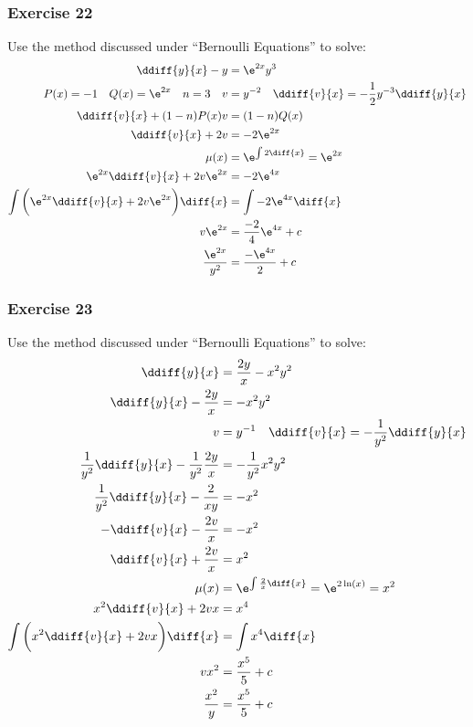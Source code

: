 \documentclass{math}
\begin{document}
\subsubsection*{Exercise 22}
Use the method discussed under ``Bernoulli Equations'' to solve:
\begin{align*}
  \ddiff{y}{x}-y &= \e^{2x}y^3 \\
  P(x) = -1 \quad Q(x) = \e^{2x} \quad n = 3 \quad
    v &= y^{-2} \quad \ddiff{v}{x} = -\frac{1}{2}y^{-3}\ddiff{y}{x} \\
  \ddiff{v}{x}+(1-n)P(x)v &= (1-n)Q(x) \\
  \ddiff{v}{x}+2v &= -2\e^{2x} \\
  \mu(x) &= \e^{\int2\diff{x}} = \e^{2x} \\
  \e^{2x}\ddiff{v}{x}+2v\e^{2x} &= -2\e^{4x} \\
  \int\bigg(\e^{2x}\ddiff{v}{x}+2v\e^{2x}\bigg)\diff{x} &=
    \int-2\e^{4x}\diff{x} \\
  v\e^{2x} &= \frac{-2}{4}\e^{4x}+c \\
  \frac{\e^{2x}}{y^2} &= \frac{-\e^{4x}}{2}+c
\end{align*}

\subsubsection*{Exercise 23}
Use the method discussed under ``Bernoulli Equations'' to solve:
\begin{align*}
  \ddiff{y}{x} &= \frac{2y}{x}-x^2y^2 \\
  \ddiff{y}{x}-\frac{2y}{x} &= -x^2y^2 \\
  v &= y^{-1} \quad \ddiff{v}{x} = -\frac{1}{y^2}\ddiff{y}{x} \\
  \frac{1}{y^2}\ddiff{y}{x}-\frac{1}{y^2}\frac{2y}{x} &= -\frac{1}{y^2}x^2y^2 \\
  \frac{1}{y^2}\ddiff{y}{x}-\frac{2}{xy} &= -x^2 \\
  -\ddiff{v}{x}-\frac{2v}{x} &= -x^2 \\
  \ddiff{v}{x}+\frac{2v}{x} &= x^2 \\
  \mu(x) &= \e^{\int\frac{2}{x}\diff{x}} = \e^{2\ln(x)} = x^2 \\
  x^2\ddiff{v}{x}+2vx &= x^4 \\
  \int\bigg(x^2\ddiff{v}{x}+2vx\bigg)\diff{x} &= \int x^4\diff{x} \\
  vx^2 &= \frac{x^5}{5}+c \\
  \frac{x^2}{y} &= \frac{x^5}{5}+c
\end{align*}
\end{document}
